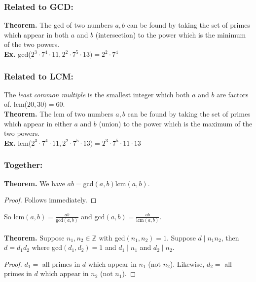\documentclass[class=article, crop=false]{standalone}
\def\integers{{\mathbb Z}}
\begin{document}
\subsubsection*{Related to GCD:}
\textbf{Theorem.} The gcd of two numbers $a,b$ can be found by taking the set of primes which appear in both
$a$ and $b$ (intersection) to the power which is the minimum of the two powers.\\
\textbf{Ex.} gcd($2^3\cdot7^4\cdot11, 2^2\cdot7^5\cdot13)=2^2\cdot 7^4$
\subsubsection*{Related to LCM:}
The \emph{least common multiple} is the smallest integer which both $a$ and $b$ are factors of. lcm($20,30)=60$.\\
\textbf{Theorem.} The lcm of two numbers $a,b$ can be found by taking the set of primes which appear in either $a$ and $b$
(union) to the power which is the maximum of the two powers.\\
\textbf{Ex.} lcm($2^3\cdot7^4\cdot11, 2^2\cdot7^5\cdot13)=2^3\cdot 7^5\cdot11\cdot13$
\subsubsection*{Together:}
\textbf{Theorem.} We have $ab = $gcd$(a,b)$lcm$(a,b)$.
\begin{proof}
	Follows immediately.
\end{proof}
\noindent So lcm$(a,b)=\frac{ab}{\text{gcd}(a,b)}$ and gcd$(a,b)=\frac{ab}{\text{lcm}(a,b)}$.
\\\\
\textbf{Theorem.} Suppose $n_1, n_2\in\integers$ with gcd$(n_1,n_2)=1$. Suppose $d\mid n_1 n_2$,
then $d=d_1 d_2$ where gcd$(d_1, d_2)=1$ and $d_1\mid n_1$ and $d_2\mid n_2$.
\begin{proof}
	$d_1=$ all primes in $d$ which appear in $n_1$ (not $n_2$). Likewise, $d_2=$ all primes in $d$ which appear in
	$n_2$ (not $n_1$).
\end{proof}
\end{document}
